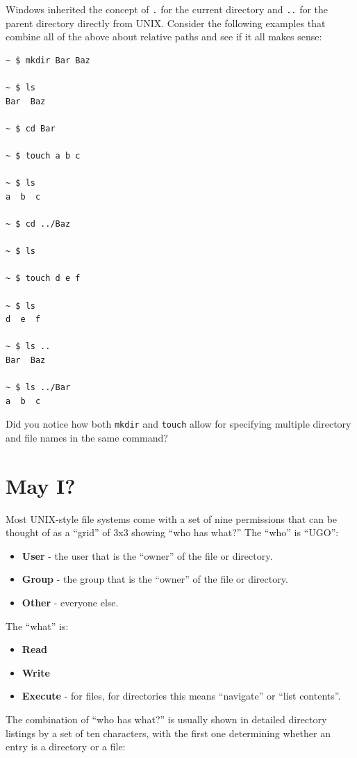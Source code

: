 \documentclass[10pt,]{book}
\numberwithin{figure}{chapter}
\begin{document}
Windows inherited the concept of \texttt{.} for the current directory
and \texttt{..} for the parent directory directly from UNIX. Consider
the following examples that combine all of the above about relative
paths and see if it all makes sense:

\begin{verbatim}
~ $ mkdir Bar Baz

~ $ ls
Bar  Baz

~ $ cd Bar

~ $ touch a b c

~ $ ls
a  b  c

~ $ cd ../Baz

~ $ ls

~ $ touch d e f

~ $ ls
d  e  f

~ $ ls ..
Bar  Baz

~ $ ls ../Bar
a  b  c
\end{verbatim}

Did you notice how both \texttt{mkdir} and \texttt{touch} allow for
specifying multiple directory and file names in the same command?

\section{May I?}\label{may-i}

Most UNIX-style file systems come with a set of nine permissions that
can be thought of as a ``grid'' of 3x3 showing ``who has what?'' The
``who'' is ``UGO'':

\begin{itemize}
\item
  \textbf{User} - the user that is the ``owner'' of the file or
  directory.
\item
  \textbf{Group} - the group that is the ``owner'' of the file or
  directory.
\item
  \textbf{Other} - everyone else.
\end{itemize}

The ``what'' is:

\begin{itemize}
\item
  \textbf{Read}
\item
  \textbf{Write}
\item
  \textbf{Execute} - for files, for directories this means ``navigate''
  or ``list contents''.
\end{itemize}

The combination of ``who has what?'' is usually shown in detailed
directory listings by a set of ten characters, with the first one
determining whether an entry is a directory or a file:
\end{document}
